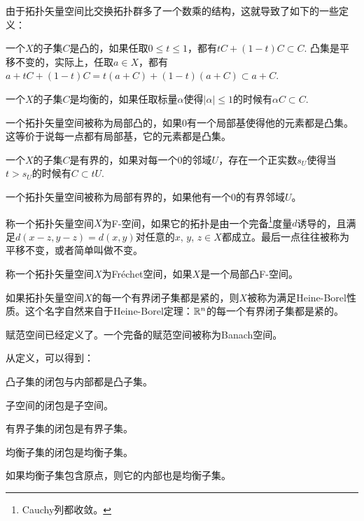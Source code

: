 \begin{para}
由于拓扑矢量空间比交换拓扑群多了一个数乘的结构，这就导致了如下的一些定义：
\begin{compactenum}
\item 一个$X$的子集$C$是凸的，如果任取$0\leq t\leq 1$，都有$tC+(1-t)C\subset C$. 凸集是平移不变的，实际上，任取$a\in X$，都有$a+tC+(1-t)C=t(a+C)+(1-t)(a+C)\subset a+C$.

\item 一个$X$的子集$C$是均衡的，如果任取标量$\alpha$使得$|\alpha|\leq 1$的时候有$\alpha C\subset C$.

\item 一个拓扑矢量空间被称为局部凸的，如果$0$有一个局部基使得他的元素都是凸集。这等价于说每一点都有局部基，它的元素都是凸集。

\item 一个$X$的子集$C$是有界的，如果对每一个$0$的邻域$U$，存在一个正实数$s_U$使得当$t>s_U$的时候有$C\subset tU$.

\item 一个拓扑矢量空间被称为局部有界的，如果他有一个$0$的有界邻域$U$。

\item 称一个拓扑矢量空间$X$为F-空间，如果它的拓扑是由一个完备\footnote{Cauchy列都收敛。}度量$d$诱导的，且满足$d(x-z,y-z)=d(x,y)$对任意的$x$, $y$, $z\in X$都成立。最后一点往往被称为平移不变，或者简单叫做不变。

\item 称一个拓扑矢量空间$X$为Fr\'{e}chet空间，如果$X$是一个局部凸F-空间。

\item 如果拓扑矢量空间$X$的每一个有界闭子集都是紧的，则$X$被称为满足Heine-Borel性质。这个名字自然来自于Heine-Borel定理：$\mathbb{R}^n$的每一个有界闭子集都是紧的。

\item 赋范空间已经定义了。一个完备的赋范空间被称为Banach空间。
\end{compactenum}
\end{para}

从定义，可以得到：
\begin{compactenum}
\item 凸子集的闭包与内部都是凸子集。
\item 子空间的闭包是子空间。
\item 有界子集的闭包是有界子集。
\item 均衡子集的闭包是均衡子集。
\item 如果均衡子集包含原点，则它的内部也是均衡子集。
\end{compactenum}

